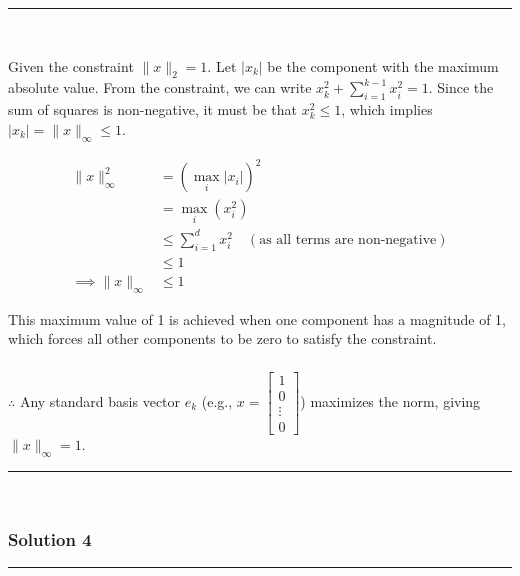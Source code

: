 \documentclass{article}
\begin{document}
\noindent\rule{\textwidth}{0.4pt}\\

\newpage

\parbox{\textwidth}{
Given the constraint $\|x\|_{2} = 1$. Let $|x_k|$ be the component with the maximum absolute value. From the constraint, we can write $x_k^2 + \sum_{i=1}^{k-1} x_i^2 = 1$. Since the sum of squares is non-negative, it must be that $x_k^2 \le 1$, which implies $|x_k| = \|x\|_{\infty} \le 1$.
}
\begin{align*}
    \|x\|_{\infty}^2 &= (\max_i |x_i|)^2 \\
    &= \max_i (x_i^2) \\
    &\le \sum_{i=1}^d x_i^2 \quad (\text{as all terms are non-negative}) \\
    &\le 1 \\
    \implies \|x\|_{\infty} &\le 1
\end{align*}
\parbox{\textwidth}{
This maximum value of 1 is achieved when one component has a magnitude of 1, which forces all other components to be zero to satisfy the constraint.
}
\subsubsection*{\normalfont}{$\therefore$ Any standard basis vector $e_k$ (e.g., $x=\begin{bmatrix} 1 \\ 0 \\ \vdots \\ 0 \end{bmatrix}$) maximizes the norm, giving $\|x\|_{\infty}=1$.}

\noindent\rule{\textwidth}{0.4pt}\\

\newpage

\subsubsection*{Solution 4}
\noindent\rule{\textwidth}{0.4pt}\\
\end{document}

